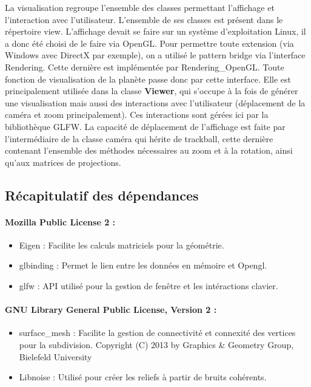 \documentclass[a4paper]{article}
\begin{document}

La visualisation regroupe l'ensemble des classes permettant l'affichage et l'interaction avec l'utilisateur. L'ensemble de ses classes est présent dans le répertoire view.
L'affichage devait se faire sur un système d'exploitation Linux, il a donc été choisi de le faire via OpenGL. Pour permettre toute extension (via Windows avec DirectX par exemple), on a utilisé le pattern bridge via l'interface Rendering. Cette dernière est implémentée par Rendering\_OpenGL. Toute fonction de visualisation de la planète passe donc par cette interface. Elle est principalement utilisée dans la classe \textbf{Viewer}, qui s'occupe à la fois de générer une visualisation mais aussi des interactions avec l'utilisateur (déplacement de la caméra et zoom principalement). Ces interactions sont gérées ici par la bibliothèque GLFW.
La capacité de déplacement de l'affichage est faite par l'intermédiaire de la classe caméra qui hérite de trackball, cette dernière contenant l'ensemble des méthodes nécessaires au zoom et à la rotation, ainsi qu'aux matrices de projections.

\subsection{Récapitulatif des dépendances}

\paragraph{Mozilla Public License 2 : }
\begin{itemize}
\item Eigen :  
     Facilite les calculs matriciels pour la géométrie. 
 \item glbinding :  
     Permet le lien entre les données en mémoire et Opengl.
\item glfw : 
     API utilisé pour la gestion de fenêtre et les intéractions clavier.
\end{itemize}

\paragraph{GNU Library General Public License, Version 2 : }
\begin{itemize}
\item surface\_mesh :
    Facilite la gestion de connectivité et connexité des vertices pour la subdivision. Copyright (C) 2013 by Graphics \& Geometry Group, Bielefeld University
\item Libnoise :
    Utilisé pour créer les reliefs à partir de bruits cohérents.
\end{itemize}
\end{document}
